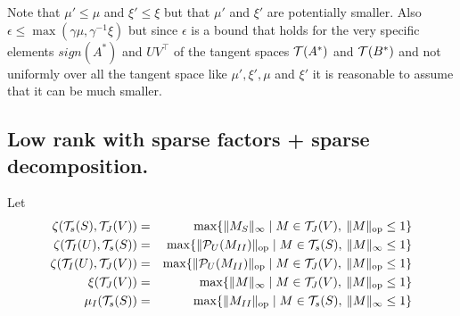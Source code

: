 \documentclass{article}
\begin{document}
Note that $\mu'\leq \mu$ and $\xi'\leq \xi$ but that $\mu'$ and $\xi'$ are potentially smaller. Also $\epsilon \leq \max(\gamma \mu, \gamma^{-1}\xi)$ but since $\epsilon$ is a bound that holds for the very specific elements $sign(A^*)$ and $UV^\top$ of the tangent spaces $\mathcal{T}(A^*)$ and $\mathcal{T}(B^*)$ and not uniformly over all the tangent space like $\mu', \xi',\mu$ and $\xi'$ it is reasonable to assume that it can be much smaller. 

\subsection*{Low rank with sparse factors + sparse decomposition.}
Let 
\begin{eqnarray*}
\zeta(\mathcal{T}_s(S),\mathcal{T}_J(V))&=&\max \{ {\|M_S\|_\infty} \mid M \in \mathcal{T}_J(V), \: \|M\|_{{\rm op}}\leq 1\}\\
\zeta(\mathcal{T}_I(U),\mathcal{T}_s(S))&=&\max \{ {\|\mathcal{P}_{U}(M_{II})\|_{{\rm op}}} \mid M \in \mathcal{T}_s(S), \: \|M\|_{\infty}\leq 1\}\\
\zeta(\mathcal{T}_I(U),\mathcal{T}_J(V))&=&\max \{ {\|\mathcal{P}_{U}(M_{II})\|_{{\rm op}}} \mid  M \in \mathcal{T}_J(V), \: \|M\|_{{\rm op}}\leq 1\}\\
\xi(\mathcal{T}_J(V))&=&\max \{ {\|M\|_\infty} \mid M \in \mathcal{T}_J(V), \: \|M\|_{{\rm op}}\leq 1\}\\
\mu_I(\mathcal{T}_s(S))&=&\max \{ {\|M_{II}\|_{\rm op}} \mid M \in \mathcal{T}_s(S), \: \|M\|_{\infty}\leq 1\}\\
\end{eqnarray*}
\end{document}
